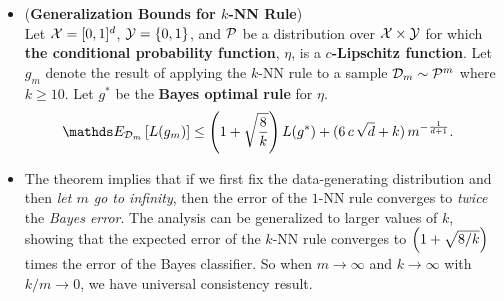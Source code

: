 \documentclass[11pt]{article}
\begin{document}
\begin{itemize}
\item \begin{proposition} (\textbf{Generalization Bounds for $k$-NN Rule}) \citep{shalev2014understanding}\\
Let ${\mathcal X} = [0,1]^d$, ${\mathcal Y} = \left\{0,1\right\}$, and ${\mathcal P}$ be a distribution over ${\mathcal X} \times {\mathcal Y}$ for which \textbf{the conditional probability function}, $\eta$, is a \textbf{$c$-Lipschitz function}.  Let $g_m$ denote the result of applying the $k$-NN rule to a sample ${\mathcal D}_m \sim {\mathcal P}^{m}$ where $k \ge 10$. Let $g^{*}$ be the \textbf{Bayes optimal rule} for $\eta$. 
\begin{align*}
\E{\cD_m}{L(g_{m})} &\le \paren{1+ \sqrt{\frac{8}{k}}} L(g^{*}) + (6\,c\,\sqrt{d}+ k)\,m^{-\frac{1}{d+1}}.
\end{align*}
\end{proposition}

\item \begin{remark}  
The theorem implies that if we first fix the data-generating distribution and then \emph{let $m$ go to infinity}, then the error of the $1$-NN rule converges to \emph{twice} the \emph{Bayes error}. The analysis can be generalized to larger values of $k$, showing that the expected error of the $k$-NN rule converges to $\left(1+ \sqrt{8/k}\right)$ times the error of the Bayes classifier.  So when $m \rightarrow \infty$ and $k\rightarrow \infty$ with $k/m \rightarrow 0$, we have universal consistency result.
\end{remark}
\end{itemize}
\end{document}
